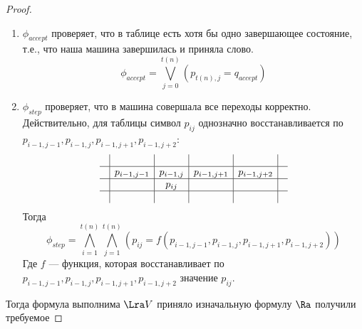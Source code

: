 \begin{proof}
\begin{enumerate}
        \[\begin{array}{cl}
            \phi_{start} & = \underbrace{(p_{00} = q_1)}_{q_1} \wedge \underbrace{(p_{01} = x_1) \wedge \dots \wedge (p_{0n} = x_n)}_{x} \wedge \underbrace{(p_{0, n+1} = \#)}_{\#} \wedge \\
            & \wedge \underbrace{(p_{0, n + 2} = 0 \vee p_{0, n + 2} = 1) \wedge \dots \wedge (p_{0, n + m + 1} = 0 \vee p_{0, n + m + 1} = 1)}_{y} \wedge \\
            & \wedge \underbrace{(p_{0, n + m + 2} = \#) \wedge \dots \wedge (p_{0, t(n)} = \#)}_{\#\dots\#}
        \end{array}\]
        \item \(\phi_{accept}\) проверяет, что в таблице есть хотя бы одно завершающее состояние, т.е., что наша машина завершилась и приняла слово.
        \[\phi_{accept} = \bigvee_{j = 0}^{t(n)} (p_{t(n), j} = q_{accept})\]
        \item \(\phi_{step}\) проверяет, что в машина совершала все переходы корректно. Действительно, для таблицы символ \(p_{ij}\) однозначно восстанавливается по \(p_{i-1, j-1}, p_{i-1, j}, p_{i-1, j+1}, p_{i-1, j+2}\):
        \[\begin{array}{c|c|c|c|c|c}
            & & & & & \\
            \hline
            & p_{i-1, j-1} & p_{i-1, j} &  p_{i-1, j+1} & p_{i-1, j+2} & \\
            \hline
            & & p_{ij} & & & \\
            \hline
            & & & & & \\
        \end{array}\]
        Тогда 
        \[\phi_{step} = \bigwedge_{i = 1}^{t(n)}\bigwedge_{j = 1}^{t(n)} (p_{ij} = f(p_{i-1, j-1}, p_{i-1, j}, p_{i-1, j+1}, p_{i-1, j+2}))\]
        Где \(f\) --- функция, которая восстанавливает по \(p_{i-1, j-1}, p_{i-1, j}, p_{i-1, j+1}, p_{i-1, j+2}\) значение \(p_{ij}\).
    \end{enumerate}
    Тогда формула выполнима \(\Lra V\) приняло изначальную формулу \(\Ra\) получили требуемое
\end{proof}

